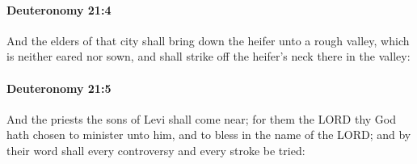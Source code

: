 		\paragraph{Deuteronomy 21:4} %
			\label{DEUTERONOMY-21-4}

			And the elders of that city shall bring down the heifer unto a rough valley, which is neither eared nor sown, and shall strike off the heifer's neck there in the valley:


		\paragraph{Deuteronomy 21:5} %
			\label{DEUTERONOMY-21-5}

			And the priests the sons of Levi shall come near; for them the LORD thy God hath chosen to minister unto him, and to bless in the name of the LORD; and by their word shall every controversy and every stroke be tried:

